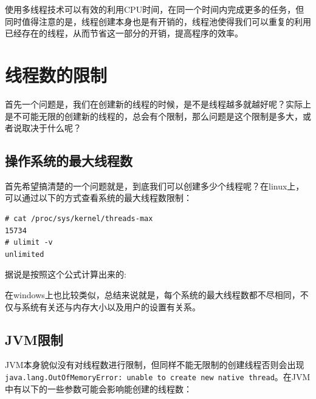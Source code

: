 \documentclass[12pt]{article}
\begin{document}
\makeblogtitle

使用多线程技术可以有效的利用CPU时间，在同一个时间内完成更多的任务，但同时值得注意的是，线程创建本身也是有开销的，线程池使得我们可以重复的利用已经存在的线程，从而节省这一部分的开销，提高程序的效率。

\section{线程数的限制}\label{ux7ebfux7a0bux6570ux7684ux9650ux5236}

首先一个问题是，我们在创建新的线程的时候，是不是线程越多就越好呢？实际上是不可能无限的创建新的线程的，总会有个限制，那么问题是这个限制是多大，或者说取决于什么呢？

\subsection{操作系统的最大线程数}\label{ux64cdux4f5cux7cfbux7edfux7684ux6700ux5927ux7ebfux7a0bux6570}

首先希望搞清楚的一个问题就是，到底我们可以创建多少个线程呢？在linux上，可以通过以下的方式查看系统的最大线程数限制：

\begin{verbatim}
# cat /proc/sys/kernel/threads-max
15734
# ulimit -v
unlimited
\end{verbatim}

据说是按照这个公式计算出来的:

\begin{Shaded}
\begin{Highlighting}[]
\OperatorTok{=}\OperatorTok{/} \OperatorTok{(} \OperatorTok{*}\OperatorTok{/}\OperatorTok{);}
\end{Highlighting}
\end{Shaded}

在windows上也比较类似，总结来说就是，每个系统的最大线程数都不尽相同，不仅与系统有关还与内存大小以及用户的设置有关系。

\subsection{JVM限制}\label{jvmux9650ux5236}

JVM本身貌似没有对线程数进行限制，但同样不能无限制的创建线程否则会出现\texttt{java.lang.OutOfMemoryError:\ unable\ to\ create\ new\ native\ thread}。在JVM中有以下的一些参数可能会影响能创建的线程数：
\end{document}
